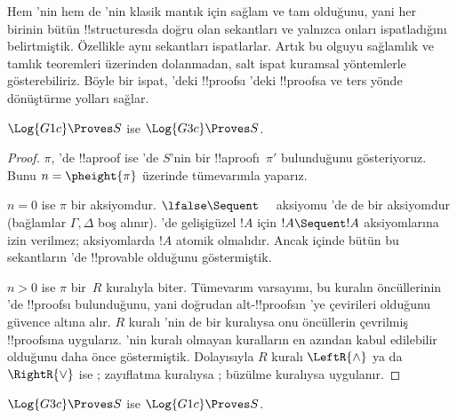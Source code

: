 \documentclass[../../../include/open-logic-section]{subfiles}
\begin{document}


Hem 'nin hem de 'nin klasik mantık için sağlam ve tam
olduğunu, yani her birinin bütün !!{structure}s{}da doğru olan sekantları ve
yalnızca onları ispatladığını belirtmiştik. Özellikle aynı sekantları
ispatlarlar. Artık bu olguyu sağlamlık ve tamlık teoremleri üzerinden
dolanmadan, salt ispat kuramsal yöntemlerle gösterebiliriz. Böyle bir ispat,
'deki !!{proof}s{}ı 'deki !!{proof}s{}a ve ters yönde
dönüştürme yolları sağlar.

\begin{prop}
$\Log{G1c} \Proves S$ ise $\Log{G3c} \Proves S$.
\end{prop}

\begin{proof}
  $\pi$, 'de !!a{proof} ise 'de $S$'nin bir
  !!a{proof}{}ı~$\pi'$ bulunduğunu gösteriyoruz. Bunu $n = \pheight{\pi}$
  üzerinde tümevarımla yaparız.

  $n = 0$ ise $\pi$ bir aksiyomdur. $\lfalse \Sequent \quad$ aksiyomu
  'de de bir aksiyomdur (bağlamlar $\Gamma, \Delta$ boş alınır).
  'de gelişigüzel $!A$ için $!A \Sequent !A$ aksiyomlarına izin
  verilmez; aksiyomlarda $!A$ atomik olmalıdır. Ancak 
  içinde bütün bu sekantların 'de !!{provable} olduğunu
  göstermiştik.
  
  $n>0$ ise $\pi$ bir~$R$ kuralıyla biter. Tümevarım varsayımı, bu kuralın
  öncüllerinin 'de !!{proof}s{}ı bulunduğunu, yani doğrudan
  alt-!!{proof}s{}ın 'ye çevirileri olduğunu güvence altına alır.
  $R$ kuralı 'nin de bir kuralıysa onu öncüllerin çevrilmiş
  !!{proof}s{}ına uygularız. 'nin kuralı olmayan kuralların en azından
  kabul edilebilir olduğunu daha önce göstermiştik. Dolayısıyla $R$ kuralı
  $\LeftR{\land}$ ya da $\RightR{\lor}$ ise
  ; zayıflatma kuralıysa
  ; büzülme kuralıysa
   uygulanır.
\end{proof}

\begin{prop}
$\Log{G3c} \Proves S$ ise $\Log{G1c} \Proves S$.
\end{prop}
\end{document}
